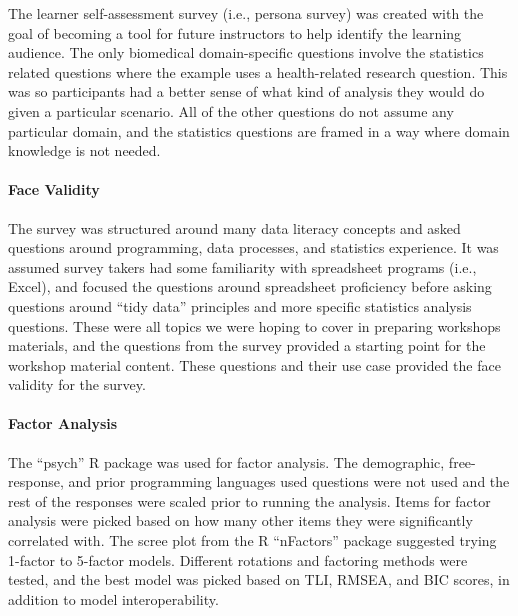 \documentclass[020-persona\_validation.tex]{subfiles}
\begin{document}
            The learner self-assessment survey (i.e., persona survey)
            was created with the goal of becoming a tool for future instructors
            to help identify the learning audience.
            The only biomedical domain-specific questions involve the statistics related questions
            where the example uses a health-related research question.
            This was so participants had a better sense of what kind of analysis they would do given a particular scenario.
            All of the other questions do not assume any particular domain,
            and the statistics questions are framed in a way where domain knowledge is not needed.

            \paragraph{Face Validity}

                The survey was structured around many data literacy concepts and asked questions around
                programming, data processes, and statistics experience.
                It was assumed survey takers had some familiarity with spreadsheet programs (i.e., Excel),
                and focused the questions around spreadsheet proficiency before asking questions
                around ``tidy data'' principles and more specific statistics analysis questions.
                These were all topics we were hoping to cover in preparing workshops materials,
                and the questions from the survey provided a starting point for the workshop material content.
                These questions and their use case provided the face validity for the survey.

            \paragraph{Factor Analysis}
        
                The ``psych'' R package was used for factor analysis.
                The demographic, free-response, and prior programming languages used questions
                were not used and the rest of the responses were scaled prior to running the analysis.
                Items for factor analysis were picked based on how many other items they were significantly correlated with.
                The scree plot from the R ``nFactors'' package suggested trying 1-factor to 5-factor models.
                Different rotations and factoring methods were tested,
                and the best model was picked based on
                TLI, RMSEA, and BIC scores, in addition to model interoperability.
\end{document}
